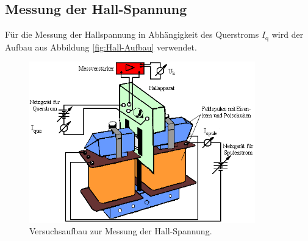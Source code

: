\subsection{Messung der Hall-Spannung}
Für die Messung der Hallspannung in Abhängigkeit des Querstroms $I_\text{q}$ wird der Aufbau aus Abbildung \eqref{fig:Hall-Aufbau} verwendet.

\begin{figure}[H]
  \centering
  \includegraphics[height=7cm]{picture/Hall-Aufbau.png}
  \caption{Versuchsaufbau zur Messung der Hall-Spannung. \cite{Leifi}}
  \label{fig:Hall-Aufbau}
\end{figure}
